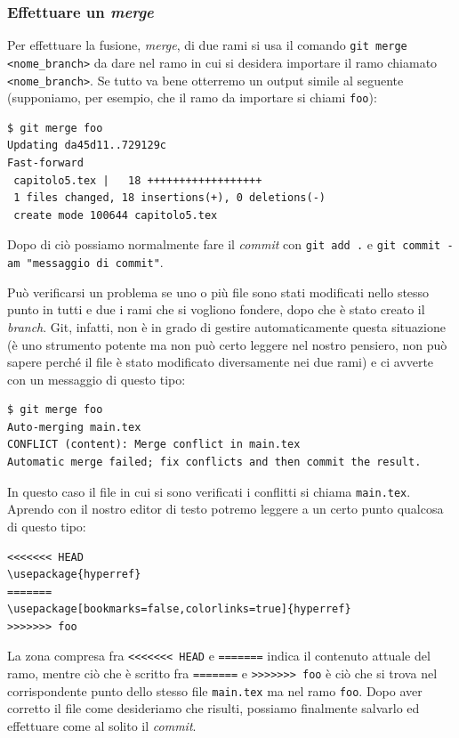 \documentclass[a4paper,12pt,oneside]{article}
\begin{document}
\subsubsection{Effettuare un \emph{merge}}
Per effettuare la fusione, \emph{merge}, di due rami si usa il comando
\lstinline|git merge <nome_branch>| da dare nel ramo in cui si desidera importare
il ramo chiamato \lstinline|<nome_branch>|. Se tutto va bene otterremo un output
simile al seguente (supponiamo, per esempio, che il ramo da importare si chiami
\lstinline|foo|):
\begin{lstlisting}
$ git merge foo
Updating da45d11..729129c
Fast-forward
 capitolo5.tex |   18 ++++++++++++++++++
 1 files changed, 18 insertions(+), 0 deletions(-)
 create mode 100644 capitolo5.tex
\end{lstlisting}
Dopo di ciò possiamo normalmente fare il \emph{commit} con
\lstinline|git add .| e \lstinline|git commit -am "messaggio di commit"|.

Può verificarsi un problema se uno o più file sono stati modificati nello stesso
punto in tutti e due i rami che si vogliono fondere, dopo che è stato creato il
\emph{branch}. Git, infatti, non è in grado di gestire automaticamente questa
situazione (è uno strumento potente ma non può certo leggere nel nostro pensiero,
non può sapere perché il file è stato modificato diversamente nei due rami) e ci
avverte con un messaggio di questo tipo:
\begin{lstlisting}[language={}]
$ git merge foo
Auto-merging main.tex
CONFLICT (content): Merge conflict in main.tex
Automatic merge failed; fix conflicts and then commit the result.
\end{lstlisting}
In questo caso il file in cui si sono verificati i conflitti si chiama
\lstinline|main.tex|. Aprendo con il nostro editor di testo potremo leggere
a un certo punto qualcosa di questo tipo:
\begin{lstlisting}[language={},emph={HEAD,foo}]
<<<<<<< HEAD
\usepackage{hyperref}
=======
\usepackage[bookmarks=false,colorlinks=true]{hyperref}
>>>>>>> foo
\end{lstlisting}
La zona compresa fra \lstinline|<<<<<<< HEAD| e \lstinline|=======| indica il
contenuto attuale del ramo, mentre ciò che è scritto fra \lstinline|=======| e
\lstinline|>>>>>>> foo| è ciò che si trova nel corrispondente punto dello stesso
file \lstinline|main.tex| ma nel ramo \lstinline|foo|. Dopo aver corretto il file
come desideriamo che risulti, possiamo finalmente salvarlo ed effettuare come al
solito il \emph{commit}.
\end{document}
